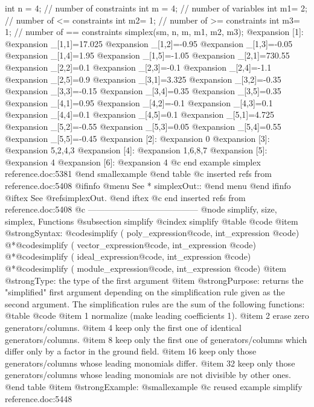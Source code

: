 {{{{{{    int n = 4;  // number of constraints
    int m = 4;  // number of variables
    int m1= 2;  // number of <= constraints
    int m2= 1;  // number of >= constraints
    int m3= 1;  // number of == constraints
    simplex(sm, n, m, m1, m2, m3);
@expansion{} [1]:
@expansion{}    _[1,1]=17.025
@expansion{}    _[1,2]=-0.95
@expansion{}    _[1,3]=-0.05
@expansion{}    _[1,4]=1.95
@expansion{}    _[1,5]=-1.05
@expansion{}    _[2,1]=730.55
@expansion{}    _[2,2]=0.1
@expansion{}    _[2,3]=-0.1
@expansion{}    _[2,4]=-1.1
@expansion{}    _[2,5]=0.9
@expansion{}    _[3,1]=3.325
@expansion{}    _[3,2]=-0.35
@expansion{}    _[3,3]=-0.15
@expansion{}    _[3,4]=0.35
@expansion{}    _[3,5]=0.35
@expansion{}    _[4,1]=0.95
@expansion{}    _[4,2]=-0.1
@expansion{}    _[4,3]=0.1
@expansion{}    _[4,4]=0.1
@expansion{}    _[4,5]=0.1
@expansion{}    _[5,1]=4.725
@expansion{}    _[5,2]=-0.55
@expansion{}    _[5,3]=0.05
@expansion{}    _[5,4]=0.55
@expansion{}    _[5,5]=-0.45
@expansion{} [2]:
@expansion{}    0
@expansion{} [3]:
@expansion{}    5,2,4,3
@expansion{} [4]:
@expansion{}    1,6,8,7
@expansion{} [5]:
@expansion{}    4
@expansion{} [6]:
@expansion{}    4
@c end example simplex reference.doc:5381
@end smallexample
@end table
@c inserted refs from reference.doc:5408
@ifinfo
@menu
See
* simplexOut::
@end menu
@end ifinfo
@iftex
See
@ref{simplexOut}.
@end iftex
@c end inserted refs from reference.doc:5408
@c ---------------------------------------
@node simplify, size, simplex, Functions
@subsection simplify
@cindex simplify
@table @code
@item @strong{Syntax:}
@code{simplify (} poly_expression@code{,} int_expression @code{)}
@*@code{simplify (} vector_expression@code{,} int_expression @code{)}
@*@code{simplify (} ideal_expression@code{,} int_expression @code{)}
@*@code{simplify (} module_expression@code{,} int_expression @code{)}
@item @strong{Type:}
the type of the first argument
@item @strong{Purpose:}
returns the "simplified" first argument depending on the simplification rule
given as the second argument.
The simplification rules are the sum of the following
functions:
@table @code
@item 1
normalize (make leading coefficients 1).
@item 2
erase zero generators/columns.
@item 4
keep only the first one of identical generators/columns.
@item 8
keep only the first one of generators/columns which differ only by a factor
in the ground field.
@item 16
keep only those generators/columns whose leading monomials
differ.
@item 32
keep only those generators/columns whose leading monomials are
not divisible by other ones.
@end table
@item @strong{Example:}
@smallexample
@c reused example simplify reference.doc:5448 
}}}}}}
